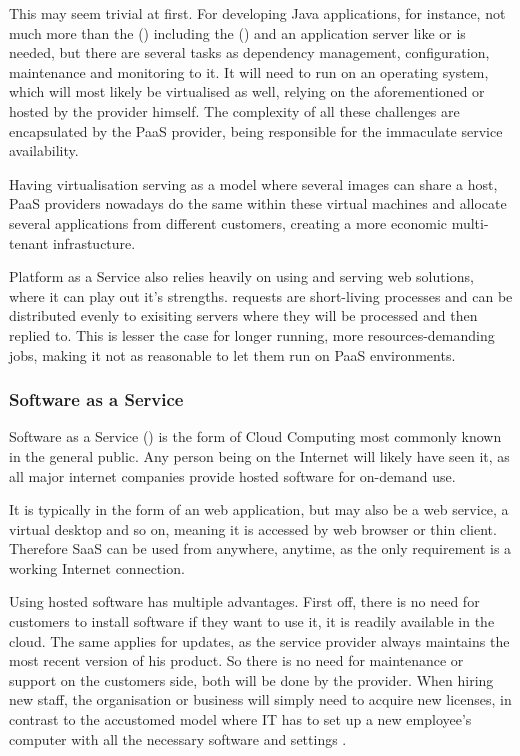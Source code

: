 This may seem trivial at first. For developing Java applications, for instance, not much more than the  () including the  () and an application server like  or  is needed, but there are several tasks as dependency management, configuration, maintenance and monitoring to it. It will need to run on an operating system, which will most likely be virtualised as well, relying on the aforementioned  or hosted by the provider himself. The complexity of all these challenges are encapsulated by the PaaS provider, being responsible for the immaculate service availability.

Having virtualisation serving as a model where several images can share a host, PaaS providers nowadays do the same within these virtual machines and allocate several applications from different customers, creating a more economic multi-tenant infrastucture.

Platform as a Service also relies heavily on using and serving web solutions, where it can play out it's strengths.  requests are short-living processes and can be distributed evenly to exisiting servers where they will be processed and then replied to. This is lesser the case for longer running, more resources-demanding jobs, making it not as reasonable to let them run on PaaS environments.

\subsubsection{Software as a Service}
\label{subsubsec:saas}
Software as a Service () is the form of Cloud Computing most commonly known in the general public. Any person being on the Internet will likely have seen it, as all major internet companies provide hosted software for on-demand use. 

\pagebreak

It is typically in the form of an web application, but may also be a web service, a virtual desktop and so on, meaning it is accessed by web browser or thin client. Therefore SaaS can be used from anywhere, anytime, as the only requirement is a working Internet connection.

Using hosted software has multiple advantages. First off, there is no need for customers to install software if they want to use it, it is readily available in the cloud. The same applies for updates, as the service provider always maintains the most recent version of his product. So there is no need for maintenance or support on the customers side, both will be done by the provider. When hiring new staff, the organisation or business will simply need to acquire new licenses, in contrast to the accustomed model where IT has to set up a new employee's computer with all the necessary software and settings \cite{hausman2013cloud}.

